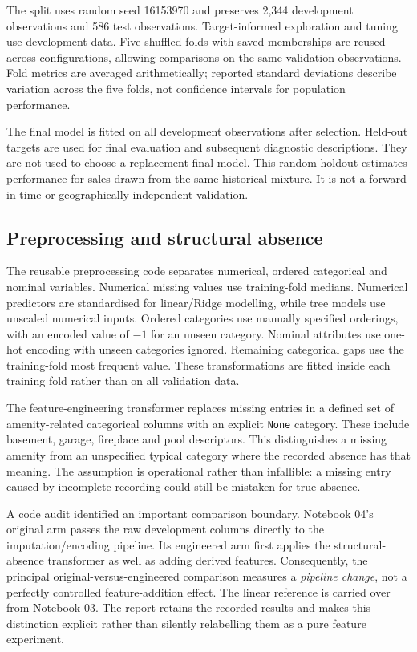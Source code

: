\documentclass{sigkddExp}
\begin{document}
The split uses random seed 16153970 and preserves 2,344 development observations and 586 test observations. Target-informed exploration and tuning use development data. Five shuffled folds with saved memberships are reused across configurations, allowing comparisons on the same validation observations. Fold metrics are averaged arithmetically; reported standard deviations describe variation across the five folds, not confidence intervals for population performance.

The final model is fitted on all development observations after selection. Held-out targets are used for final evaluation and subsequent diagnostic descriptions. They are not used to choose a replacement final model. This random holdout estimates performance for sales drawn from the same historical mixture. It is not a forward-in-time or geographically independent validation.

\subsection{Preprocessing and structural absence}
The reusable preprocessing code separates numerical, ordered categorical and nominal variables. Numerical missing values use training-fold medians. Numerical predictors are standardised for linear/Ridge modelling, while tree models use unscaled numerical inputs. Ordered categories use manually specified orderings, with an encoded value of $-1$ for an unseen category. Nominal attributes use one-hot encoding with unseen categories ignored. Remaining categorical gaps use the training-fold most frequent value. These transformations are fitted inside each training fold rather than on all validation data.

The feature-engineering transformer replaces missing entries in a defined set of amenity-related categorical columns with an explicit \texttt{None} category. These include basement, garage, fireplace and pool descriptors. This distinguishes a missing amenity from an unspecified typical category where the recorded absence has that meaning. The assumption is operational rather than infallible: a missing entry caused by incomplete recording could still be mistaken for true absence.

A code audit identified an important comparison boundary. Notebook 04's original arm passes the raw development columns directly to the imputation/encoding pipeline. Its engineered arm first applies the structural-absence transformer as well as adding derived features. Consequently, the principal original-versus-engineered comparison measures a \emph{pipeline change}, not a perfectly controlled feature-addition effect. The linear reference is carried over from Notebook 03. The report retains the recorded results and makes this distinction explicit rather than silently relabelling them as a pure feature experiment.
\end{document}
